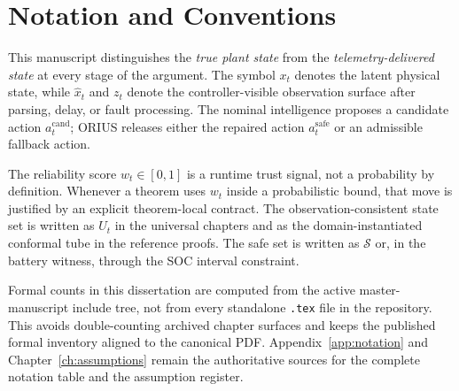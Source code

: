 \chapter*{Notation and Conventions}

This manuscript distinguishes the \emph{true plant state} from the
\emph{telemetry-delivered state} at every stage of the argument.  The symbol
$x_t$ denotes the latent physical state, while $\hat{x}_t$ and $z_t$ denote the
controller-visible observation surface after parsing, delay, or fault
processing.  The nominal intelligence proposes a candidate action
$a_t^{\mathrm{cand}}$; ORIUS releases either the repaired action
$a_t^{\mathrm{safe}}$ or an admissible fallback action.

The reliability score $w_t \in [0,1]$ is a runtime trust signal, not a
probability by definition.  Whenever a theorem uses $w_t$ inside a probabilistic
bound, that move is justified by an explicit theorem-local contract.  The
observation-consistent state set is written as $U_t$ in the universal chapters
and as the domain-instantiated conformal tube in the reference proofs.  The
safe set is written as $\mathcal{S}$ or, in the battery witness, through the
SOC interval constraint.

Formal counts in this dissertation are computed from the active master-manuscript
include tree, not from every standalone \texttt{.tex} file in the repository.
This avoids double-counting archived chapter surfaces and keeps the published
formal inventory aligned to the canonical PDF.  Appendix~\ref{app:notation} and
Chapter~\ref{ch:assumptions} remain the authoritative sources for the complete
notation table and the assumption register.
